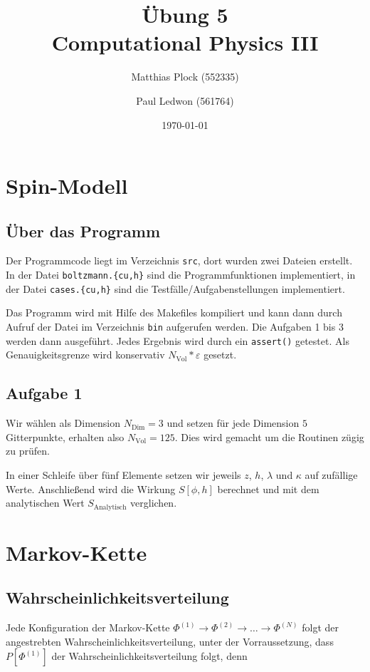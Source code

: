 \documentclass[10pt,a4paper]{article}
\title{Übung 5 \\Computational Physics III}
\author{Matthias Plock (552335) \and Paul Ledwon (561764)} %
\date{\today}
\begin{document}
\maketitle
\tableofcontents

\pagestyle{myheadings}                  %

\section{Spin-Modell}

\subsection{Über das Programm}

Der Programmcode liegt im Verzeichnis \texttt{src}, dort wurden zwei Dateien
erstellt. In der Datei \texttt{boltzmann.\{cu,h\}} sind die Programmfunktionen
implementiert, in der Datei \texttt{cases.\{cu,h\}} sind die
Testfälle/Aufgabenstellungen implementiert.

Das Programm wird mit Hilfe des Makefiles kompiliert und kann dann durch Aufruf
der Datei im Verzeichnis \texttt{bin} aufgerufen werden.
Die Aufgaben 1 bis 3 werden dann ausgeführt. Jedes Ergebnis wird durch ein
\texttt{assert()} getestet. Als Genauigkeitsgrenze wird konservativ
$N_{\text{Vol}}*\varepsilon$ gesetzt.

\subsection{Aufgabe 1}

Wir wählen als Dimension $N_{\text{Dim}} = 3$ und setzen für jede Dimension $5$
Gitterpunkte, erhalten also $N_{\text{Vol}} = 125$. Dies wird gemacht um die
Routinen zügig zu prüfen.

In einer Schleife über fünf Elemente setzen wir jeweils $z$, $h$, $\lambda$ und
$\kappa$ auf zufällige Werte. Anschließend wird die Wirkung $S\left[ \phi, h
\right]$ berechnet und mit dem analytischen Wert $S_{\text{Analytisch}}$
verglichen.




\section{Markov-Kette}

\subsection{Wahrscheinlichkeitsverteilung}
Jede Konfiguration der Markov-Kette $\Phi^{(1)}\to \Phi^{(2)}\to\dots\to \Phi^{(N)}$
folgt der angestrebten Wahrscheinlichkeitsverteilung, unter der Vorraussetzung,
dass $P[\Phi^{(1)}]$ der Wahrscheinlichkeitsverteilung folgt, denn \\
\end{document}
